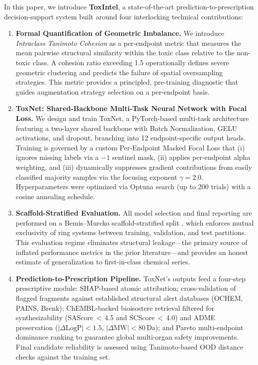 \documentclass[lettersize,journal]{IEEEtran}
\begin{document}
  In this paper, we introduce \textbf{ToxIntel}, a state-of-the-art
  prediction-to-prescription decision-support system built around four
  interlocking technical contributions:

  \begin{enumerate}

  \item \textbf{Formal Quantification of Geometric Imbalance.}
  We introduce \textit{Intraclass Tanimoto Cohesion} as a per-endpoint metric
  that measures the mean pairwise structural similarity within the toxic class
  relative to the non-toxic class.
  A cohesion ratio exceeding 1.5 operationally defines severe geometric
  clustering and predicts the failure of spatial oversampling strategies.
  This metric provides a principled, pre-training diagnostic that guides
  augmentation strategy selection on a per-endpoint basis.

\item \textbf{ToxNet: Shared-Backbone Multi-Task Neural Network with Focal Loss.}
We design and train ToxNet, a PyTorch-based multi-task architecture featuring
a two-layer shared backbone with Batch Normalization, GELU activations, and
dropout, branching into 12 endpoint-specific output heads.
Training is governed by a custom Per-Endpoint Masked Focal Loss
\cite{lin2017focal} that (i) ignores missing labels via a $-1$ sentinel mask,
(ii) applies per-endpoint alpha weighting, and (iii) dynamically suppresses
gradient contributions from easily classified majority samples via
the focusing exponent $\gamma = 2.0$.
Hyperparameters were optimized via Optuna search (up to 200 trials) with a
cosine annealing schedule.

  \item \textbf{Scaffold-Stratified Evaluation.}
  All model selection and final reporting are performed on a Bemis--Murcko
  scaffold-stratified split \cite{bemis1996}, which enforces mutual exclusivity
  of ring systems between training, validation, and test partitions.
  This evaluation regime eliminates structural leakage---the primary source of
  inflated performance metrics in the prior literature---and provides an honest
  estimate of generalization to first-in-class chemical series.

\item \textbf{Prediction-to-Prescription Pipeline.}
ToxNet's outputs feed a four-step prescriptive module:
SHAP-based atomic attribution; cross-validation of flagged fragments against
established structural alert databases (OCHEM, PAINS, Brenk); ChEMBL-backed
bioisostere retrieval filtered for synthesizability (SAScore\,$<$\,4.5 and
SCScore\,$<$\,4.0) and ADME preservation ($|\Delta\text{LogP}| < 1.5$, $|\Delta\text{MW}| < 80$\,Da);
and Pareto multi-endpoint dominance ranking to guarantee global multi-organ
safety improvements.
Final candidate reliability is assessed using Tanimoto-based OOD distance
checks against the training set.
\end{enumerate}
\end{document}
